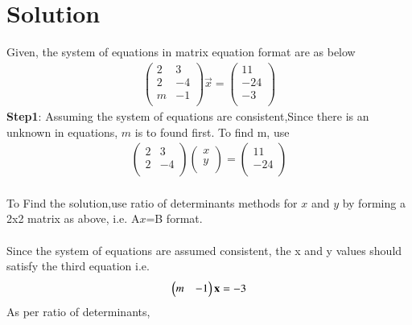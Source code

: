 \documentclass[journal,12pt,twocolumn]{IEEEtran}
\begin{document}
\section{Solution}
Given, the system of equations in matrix equation format are as below
\begin{align*}
\begin{pmatrix}2 & 3\\2 & -4\\m & -1\\\end{pmatrix}
\vec{x}=
\begin{pmatrix}11\\-24\\-3\\\end{pmatrix}
\end{align*}
\textbf{Step1}: Assuming the system of equations are consistent,Since there is an unknown in equations, $m$ is to found first. To find m, use\\
\begin{align*}
\begin{pmatrix}2 & 3\\2 & -4\\\end{pmatrix}
\begin{pmatrix}x\\y\\\end{pmatrix}=
\begin{pmatrix}11\\-24\\\end{pmatrix}
\end{align*}
\\To Find the solution,use ratio of determinants methods for $x$ and $y$ by forming a 2x2 matrix as above, i.e. A$x$=B format.\\
\\Since the system of equations are assumed consistent, the x and y values should satisfy the third equation i.e.
\begin{align*}
\begin{pmatrix}m & -1\end{pmatrix}\mathbf{x}&=-3\\
\end{align*}
As per ratio of determinants,\\
\end{document}
